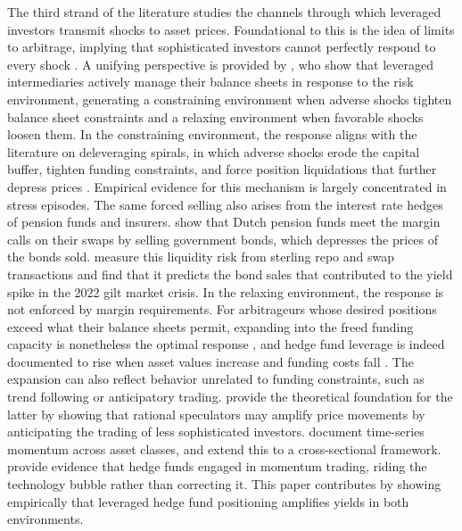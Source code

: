 \documentclass[english, 11pt, oneside]{article}
\begin{document}
The third strand of the literature studies the channels through which leveraged investors transmit shocks to asset prices. Foundational to this is the idea of limits to arbitrage, implying that sophisticated investors cannot perfectly respond to every shock \citep{shleifer1997, gromb2002}. A unifying perspective is provided by \citet{adrian2014}, who show that leveraged intermediaries actively manage their balance sheets in response to the risk environment, generating a constraining environment when adverse shocks tighten balance sheet constraints and a relaxing environment when favorable shocks loosen them. In the constraining environment, the response aligns with the literature on deleveraging spirals, in which adverse shocks erode the capital buffer, tighten funding constraints, and force position liquidations that further depress prices \citep{brunnermeier2009, geanakoplos2010, adrian2010, avalos2023}. Empirical evidence for this mechanism is largely concentrated in stress episodes. The same forced selling also arises from the interest rate hedges of pension funds and insurers. \citet{jansen2026} show that Dutch pension funds meet the margin calls on their swaps by selling government bonds, which depresses the prices of the bonds sold. \citet{alfaro2024} measure this liquidity risk from sterling repo and swap transactions and find that it predicts the bond sales that contributed to the yield spike in the 2022 gilt market crisis. In the relaxing environment, the response is not enforced by margin requirements. For arbitrageurs whose desired positions exceed what their balance sheets permit, expanding into the freed funding capacity is nonetheless the optimal response \citep{gromb2002, brunnermeier2009}, and hedge fund leverage is indeed documented to rise when asset values increase and funding costs fall \citep{ang2011}. The expansion can also reflect behavior unrelated to funding constraints, such as trend following or anticipatory trading. \citet{deLong1990} provide the theoretical foundation for the latter by showing that rational speculators may amplify price movements by anticipating the trading of less sophisticated investors. \citet{moskowitz2012} document time-series momentum across asset classes, and \citet{asness2013} extend this to a cross-sectional framework. \citet{brunnermeier2004} provide evidence that hedge funds engaged in momentum trading, riding the technology bubble rather than correcting it. This paper contributes by showing empirically that leveraged hedge fund positioning amplifies yields in both environments.
\end{document}
